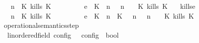 \begin{isabellebody}
\ \ {\isacartoucheopen}{\isacharparenleft}{\isasymGamma}{\isacharcomma}\ n\ {\isasymturnstile}\ {\isacharparenleft}{\isacharparenleft}K\ kills\ K\ {\isacharhash}\ {\isasymPsi}{\isacharparenright}\ {\isasymtriangleright}\ {\isasymPhi}{\isacharparenright}\isanewline
\ \ \ \ \ {\isasymhookrightarrow}\isactrlsub e\ \ {\isacharparenleft}{\isacharparenleft}{\isacharparenleft}K\ {\isasymnot}{\isasymUp}\ n{\isacharparenright}\ {\isacharhash}\ {\isasymGamma}{\isacharparenright}{\isacharcomma}\ n\ {\isasymturnstile}\ {\isasymPsi}\ {\isasymtriangleright}\ {\isacharparenleft}{\isacharparenleft}K\ kills\ K\ {\isacharhash}\ {\isasymPhi}{\isacharparenright}{\isacharparenright}{\isacartoucheclose}\isanewline
{\isacharbar}\ kills{\isacharunderscore}e{}{\isacharcolon}\isanewline
\ \ {\isacartoucheopen}{\isacharparenleft}{\isasymGamma}{\isacharcomma}\ n\ {\isasymturnstile}\ {\isacharparenleft}{\isacharparenleft}K\ kills\ K\ {\isacharhash}\ {\isasymPsi}{\isacharparenright}\ {\isasymtriangleright}\ {\isasymPhi}{\isacharparenright}\isanewline
\ \ \ \ \ {\isasymhookrightarrow}\isactrlsub e\ \ {\isacharparenleft}{\isacharparenleft}{\isacharparenleft}K\ {\isasymUp}\ n{\isacharparenright}\ {\isacharhash}\ {\isacharparenleft}K\ {\isasymnot}{\isasymUp}\ {\isasymge}\ n{\isacharparenright}\ {\isacharhash}\ {\isasymGamma}{\isacharparenright}{\isacharcomma}\ n\ {\isasymturnstile}\ {\isasymPsi}\ {\isasymtriangleright}\ {\isacharparenleft}{\isacharparenleft}K\ kills\ K\ {\isacharhash}\ {\isasymPhi}{\isacharparenright}{\isacharparenright}{\isacartoucheclose}\isanewline
\isanewline
{}\isamarkupfalse%
\ operational{\isacharunderscore}semantics{\isacharunderscore}step\isanewline
\ \ {\isacharcolon}{\isacharcolon}{\isacartoucheopen}{\isacharparenleft}{\isacharprime}{\isasymtau}{\isacharcolon}{\isacharcolon}linordered{\isacharunderscore}field{\isacharparenright}\ config\ {\isasymRightarrow}\ {\isacharprime}{\isasymtau}\ config\ {\isasymRightarrow}\ bool{\isacartoucheclose}\ \ \ \ \ \ \ \ \ \ \ \ \ \ \ \ {\isacharparenleft}{\isachardoublequoteopen}{\isacharunderscore}\ {\isasymhookrightarrow}\ {\isacharunderscore}{\isachardoublequoteclose}\ {}{}{\isacharparenright}\isanewline
{}\isanewline

\end{isabellebody}
